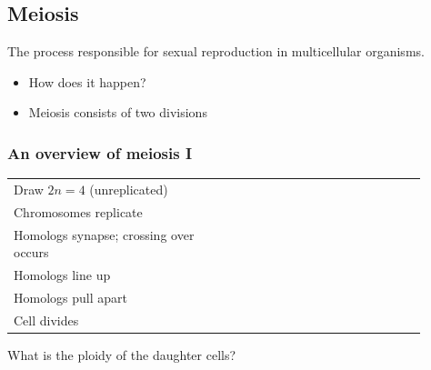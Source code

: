 \subsection{Meiosis}

\begin{frame}
     The process responsible for sexual reproduction in
    multicellular organisms.

    \vspace{4mm}
    \begin{itemize}
        \item How does it happen?

        \vspace{4mm}
        \item {} Meiosis consists of two divisions
    \end{itemize}
\end{frame}

\begin{noheadline}
\begin{frame}[t]
    \frametitle{An overview of meiosis I}
    \begin{adjustwidth}{-3em}{-3em}

        \vspace{-3mm}
    \begin{table}%
        \centering
        \begin{tabular}{ p{0.45\linewidth} p{0.45\linewidth} }
            Draw $2n=4$ (unreplicated) & \\[5ex]
            Chromosomes replicate & \\[5ex]
            {\small Homologs synapse; crossing over occurs} & \\[5ex]
            Homologs line up & \\[5ex]
            Homologs pull apart & \\[5ex]
            Cell divides & \\
        \end{tabular}
    \end{table}
    \end{adjustwidth}
    \vspace{3mm}
    What is the ploidy of the daughter cells? 
\end{frame}
\end{noheadline}

